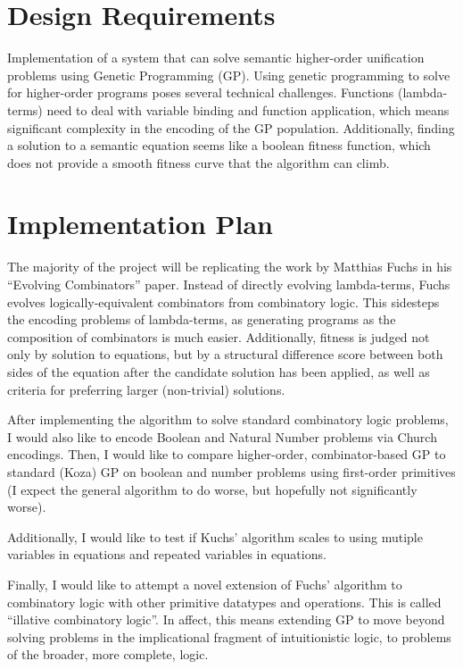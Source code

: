 \documentclass{article}
\begin{document}

\section{Design Requirements}

Implementation of a system that can solve semantic higher-order unification
problems using Genetic Programming (GP). Using genetic programming to
solve for higher-order programs poses several technical challenges.
Functions (lambda-terms) need to deal with variable binding and
function application, which means significant complexity in the
encoding of the GP population. Additionally, finding a solution to a
semantic equation seems like a boolean fitness function, which does
not provide a smooth fitness curve that the algorithm can climb. 

\section{Implementation Plan}

The majority of the project will be replicating the work by Matthias
Fuchs in his ``Evolving Combinators'' paper. Instead of directly
evolving lambda-terms, Fuchs evolves logically-equivalent combinators
from combinatory logic. This sidesteps the encoding problems of
lambda-terms, as generating programs as the composition of combinators
is much easier. Additionally, fitness is judged not only by solution
to equations, but by a structural difference score between both sides
of the equation after the candidate solution has been applied, as well
as criteria for preferring larger (non-trivial) solutions.

After implementing the algorithm to solve standard combinatory logic
problems, I would also like to encode Boolean and Natural Number
problems via Church encodings. Then, I would like to compare
higher-order, combinator-based GP to standard (Koza) GP on boolean and
number problems using first-order primitives (I expect the general
algorithm to do worse, but hopefully not significantly worse).

Additionally, I would like to test if Kuchs' algorithm scales to using
mutiple variables in equations and repeated variables in equations.

Finally, I would like to attempt a novel extension of Fuchs' algorithm
to combinatory logic with other primitive datatypes and operations.
This is called ``illative combinatory logic''. In affect, this means
extending GP to move beyond solving problems in the implicational
fragment of intuitionistic logic, to problems of the broader, more
complete, logic.
\end{document}

